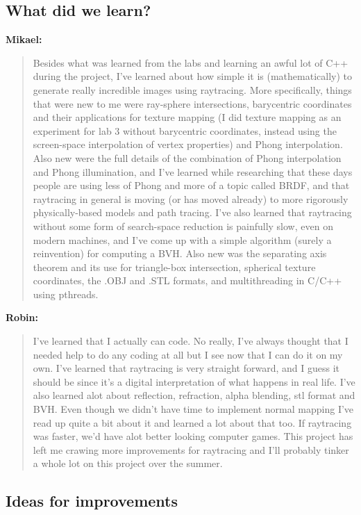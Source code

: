 \documentclass[a4paper,11pt]{article}
\begin{document}
\subsection{What did we learn?}
\textbf{Mikael:}
\begin{quote}
Besides what was learned from the labs and learning an awful lot of C++ during the project,
I've learned about how simple it is (mathematically) to generate really incredible images
using raytracing. More specifically, things that were new to me were ray-sphere intersections,
barycentric coordinates and their applications for texture mapping (I did texture mapping as
an experiment for lab 3 without barycentric coordinates, instead using the screen-space
interpolation of vertex properties) and Phong interpolation. Also new were the full details
of the combination of Phong interpolation and Phong illumination, and I've learned while
researching that these days people are using less of Phong and more of a topic called BRDF,
and that raytracing in general is moving (or has moved already) to more rigorously
physically-based models and path tracing.
I've also learned that raytracing without some form of search-space reduction is painfully
slow, even on modern machines, and I've come up with a simple algorithm (surely a reinvention)
for computing a BVH. Also new was the separating axis theorem and its use for triangle-box
intersection, spherical texture coordinates, the .OBJ and .STL formats, and multithreading
in C/C++ using pthreads.
\end{quote}
\bigskip
\textbf{Robin:}
\begin{quote}
I've learned that I actually can code. No really, I've always thought that I needed help to do 
any coding at all but I see now that I can do it on my own. 
I've learned that raytracing is very straight forward, and I guess it should be since it's 
a digital interpretation of what happens in real life. I've also learned alot about reflection, 
refraction, alpha blending, stl format and BVH. Even though we didn't have time to implement 
normal mapping I've read up quite a bit about it and learned a lot about that too. 
If raytracing was faster, we'd have alot better looking computer games.
This project has left me crawing more improvements for raytracing and I'll probably tinker a whole
lot on this project over the summer.
\end{quote}

\subsection{Ideas for improvements}
\end{document}
